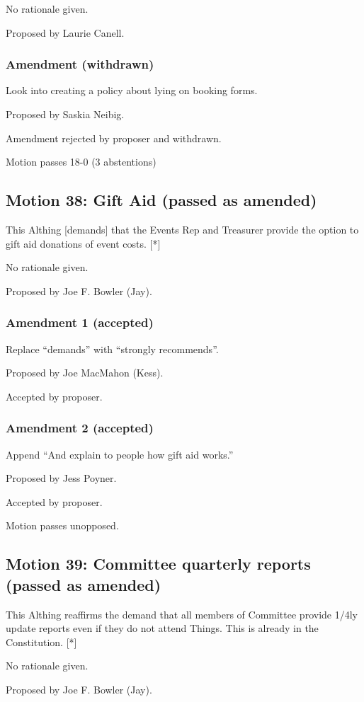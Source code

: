 \documentclass[a4paper, 12pt]{article}
\begin{document}
No rationale given.

Proposed by Laurie Canell.

\subsubsection{Amendment (withdrawn)}
Look into creating a policy about lying on booking forms.

Proposed by Saskia Neibig.

Amendment rejected by proposer and withdrawn.

Motion passes 18-0 (3 abstentions)

\subsection{Motion 38: Gift Aid (passed as amended)}
This Althing [demands] that the Events Rep and Treasurer provide the option to gift aid donations of event costs. [*]

No rationale given.

Proposed by Joe F. Bowler (Jay).

\subsubsection{Amendment 1 (accepted)}
Replace ``demands'' with ``strongly recommends''.

Proposed by Joe MacMahon (Kess).

Accepted by proposer.

\subsubsection{Amendment 2 (accepted)}
Append ``And explain to people how gift aid works.''

Proposed by Jess Poyner.

Accepted by proposer.

Motion passes unopposed.

\subsection{Motion 39: Committee quarterly reports (passed as amended)}
This Althing reaffirms the demand that all members of Committee provide 1/4ly update reports even if they do not attend Things. This is already in the Constitution. [*]

No rationale given.

Proposed by Joe F. Bowler (Jay).
\end{document}
